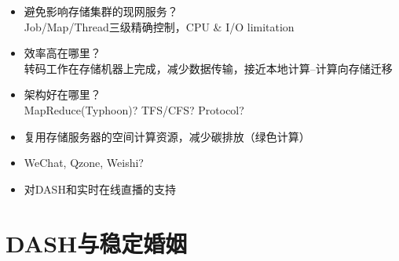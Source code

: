\documentclass{beamer}
\begin{document}
\begin{frame}
\begin{itemize}
\item 避免影响存储集群的现网服务？\\
Job/Map/Thread三级精确控制，CPU \& I/O limitation
\item 效率高在哪里？\\
转码工作在存储机器上完成，减少数据传输，接近本地计算--计算向存储迁移
\item 架构好在哪里？\\
MapReduce(Typhoon)? TFS/CFS? Protocol? 
\item 复用存储服务器的空间计算资源，减少碳排放（绿色计算）
\item WeChat, Qzone, Weishi? 
\item 对DASH和实时在线直播的支持
\end{itemize}
\end{frame}

\section{DASH与稳定婚姻}
\end{document}
